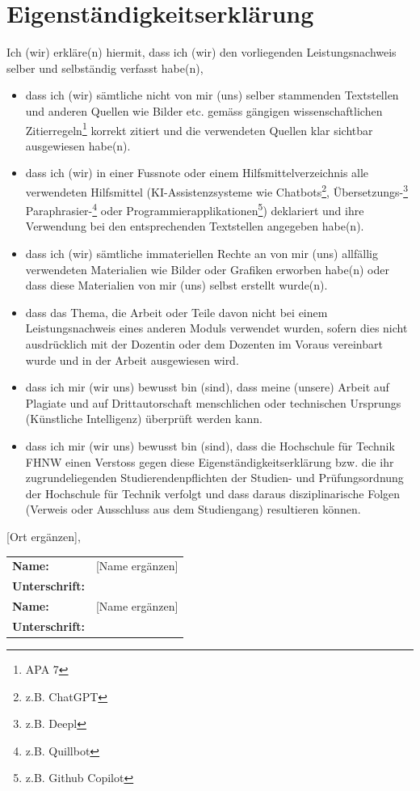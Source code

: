 \section*{Eigenständigkeitserklärung}


Ich (wir) erkläre(n) hiermit, dass ich (wir) den vorliegenden Leistungsnachweis selber und selbständig verfasst habe(n),
\begin{itemize} 
\item dass ich (wir) sämtliche nicht von mir (uns) selber stammenden Textstellen und anderen Quellen wie Bilder etc. gemäss gängigen wissenschaftlichen Zitierregeln\footnote{APA 7} korrekt zitiert und die verwendeten Quellen klar sichtbar ausgewiesen habe(n). 
\item dass ich (wir) in einer Fussnote oder einem Hilfsmittelverzeichnis alle verwendeten Hilfsmittel (KI-Assistenzsysteme wie Chatbots\footnote{z.B. ChatGPT}, Übersetzungs-\footnote{z.B. Deepl} Paraphrasier-\footnote{z.B. Quillbot} oder Programmierapplikationen\footnote{z.B. Github Copilot}) deklariert und ihre Verwendung bei den entsprechenden Textstellen angegeben habe(n).
\item dass ich (wir) sämtliche immateriellen Rechte an von mir (uns) allfällig verwendeten Materialien wie Bilder oder Grafiken erworben habe(n) oder dass diese Materialien von mir (uns) selbst erstellt wurde(n).
\item dass das Thema, die Arbeit oder Teile davon nicht bei einem Leistungsnachweis eines anderen Moduls verwendet wurden, sofern dies nicht ausdrücklich mit der Dozentin oder dem Dozenten im Voraus vereinbart wurde und in der Arbeit ausgewiesen wird. 
\item dass ich mir (wir uns) bewusst bin (sind), dass meine (unsere) Arbeit auf Plagiate und auf Drittautorschaft menschlichen oder technischen Ursprungs (Künstliche Intelligenz) überprüft werden kann.
\item dass ich mir (wir uns) bewusst bin (sind), dass die Hochschule für Technik FHNW einen Verstoss gegen diese Eigenständigkeitserklärung bzw. die ihr zugrundeliegenden Studierendenpflichten der Studien- und Prüfungsordnung der Hochschule für Technik verfolgt und dass daraus disziplinarische Folgen (Verweis oder Ausschluss aus dem Studiengang) resultieren können.
\end{itemize}

\vspace*{4ex}

[Ort ergänzen], \abgabedatum

\vspace*{4ex}

{\renewcommand{\arraystretch}{2}
\begin{tabular}{@{}>{\bfseries}ll}
Name: & [Name ergänzen]\\
Unterschrift: & \\[6ex]
Name: & [Name ergänzen]\\
Unterschrift: & \\
\end{tabular}
}
